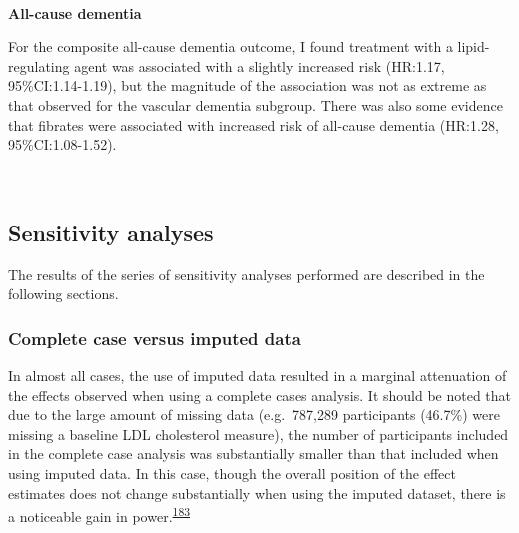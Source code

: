 \documentclass[a4paper, twoside]{templates/ociamthesis}
\begin{document}
~

\textbf{All-cause dementia}

For the composite all-cause dementia outcome, I found treatment with a lipid-regulating agent was associated with a slightly increased risk (HR:1.17, 95\%CI:1.14-1.19), but the magnitude of the association was not as extreme as that observed for the vascular dementia subgroup. There was also some evidence that fibrates were associated with increased risk of all-cause dementia (HR:1.28, 95\%CI:1.08-1.52).

~

\hypertarget{sensitivity-analyses-2}{%
\subsection{Sensitivity analyses}\label{sensitivity-analyses-2}}

The results of the series of sensitivity analyses performed are described in the following sections.

\hypertarget{complete-case-versus-imputed-data}{%
\subsubsection{Complete case versus imputed data}\label{complete-case-versus-imputed-data}}

In almost all cases, the use of imputed data resulted in a marginal attenuation of the effects observed when using a complete cases analysis. It should be noted that due to the large amount of missing data (e.g.~787,289 participants (46.7\%) were missing a baseline LDL cholesterol measure), the number of participants included in the complete case analysis was substantially smaller than that included when using imputed data. In this case, though the overall position of the effect estimates does not change substantially when using the imputed dataset, there is a noticeable gain in power.\textsuperscript{\protect\hyperlink{ref-sterne2009}{183}}

~
\end{document}
